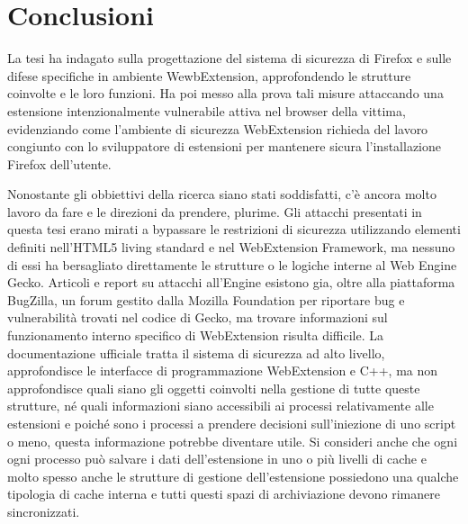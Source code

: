\documentclass{sapthesis}
\begin{document}


\chapter{Conclusioni}
\label{cap:conclusioni}
    La tesi ha indagato sulla progettazione del sistema di sicurezza di Firefox e sulle difese
    specifiche in ambiente WewbExtension, approfondendo le strutture coinvolte e le loro funzioni.
    Ha poi messo alla prova tali misure attaccando una estensione intenzionalmente vulnerabile
    attiva nel browser della vittima, evidenziando come l'ambiente di sicurezza WebExtension richieda
    del lavoro congiunto con lo sviluppatore di estensioni per mantenere sicura l'installazione
    Firefox dell'utente.

    Nonostante gli obbiettivi della ricerca siano stati soddisfatti, c'è ancora molto lavoro da fare
    e le direzioni da prendere, plurime.
    Gli attacchi presentati in questa tesi erano mirati a bypassare le restrizioni di sicurezza
    utilizzando elementi definiti nell'HTML5 living standard e nel WebExtension Framework, ma 
    nessuno di essi ha bersagliato direttamente le strutture o le logiche interne al Web Engine Gecko.
    Articoli e report su attacchi all'Engine esistono gia, oltre alla piattaforma BugZilla, un forum 
    gestito dalla Mozilla Foundation per riportare bug e vulnerabilità trovati nel codice di Gecko,
    ma trovare informazioni sul funzionamento interno specifico di WebExtension risulta difficile.
    La documentazione ufficiale tratta il sistema di sicurezza ad alto livello, approfondisce le
    interfacce di programmazione WebExtension e C++, ma non approfondisce quali siano gli oggetti
    coinvolti nella gestione di tutte queste strutture, né quali informazioni siano accessibili
    ai processi relativamente alle estensioni e poiché sono i processi a prendere decisioni
    sull'iniezione di uno script o meno, questa informazione potrebbe diventare utile. Si consideri
    anche che ogni ogni processo può salvare i dati dell'estensione in uno o più livelli di cache
    e molto spesso anche le strutture di gestione dell'estensione possiedono una qualche tipologia
    di cache interna e tutti questi spazi di archiviazione devono rimanere sincronizzati.
    
\end{document}
